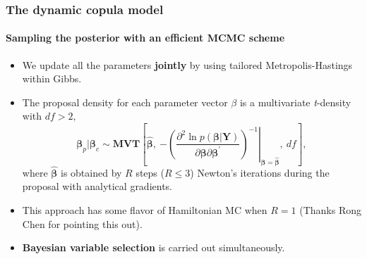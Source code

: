 \documentclass{beamer}
\begin{document}
\begin{frame}[allowframebreaks]
  \frametitle{The dynamic copula model}
  \framesubtitle{Sampling the posterior with an efficient MCMC scheme}
  \begin{itemize}
  \item We update all the parameters \textbf{jointly} by using tailored
    Metropolis-Hastings within Gibbs.
  \item The proposal density for each parameter vector $\beta$ is a multivariate \emph{t}-density with  $df>2$,
    \[
    \bm{\beta}_{p} |\bm{\beta}_{c}\sim\bm{MVT}\left[\bm{\hat{\beta}},~\left.-\left(\frac{\partial^{2}\ln
            p(\bm{\beta}|\bm{Y})}{\partial\bm{\beta}\partial\bm{\beta}^{\prime}}\right)^{-1}\right\vert
      _{\bm{\beta}=\bm{\hat{\beta}}},~df\right],
    \]
    where $\bm{\hat{\beta}}$ is obtained by $R$ steps ($R\leq 3$) Newton's
    iterations during the proposal with analytical gradients.

  \item This approach has some flavor of Hamiltonian MC when $R=1$ (Thanks Rong Chen for
    pointing this out).

  \item \textbf{Bayesian variable selection} is carried out simultaneously.


  \end{itemize}



\end{frame}
\end{document}
